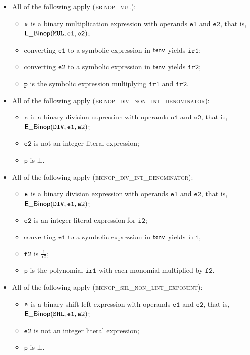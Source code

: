 \documentclass{book}
\newcommand\vitwo[0]{\texttt{i2}}
\newcommand\vftwo[0]{\texttt{f2}}
\newcommand\vp[0]{\texttt{p}}
\newcommand\veone[0]{\texttt{e1}}
\newcommand\vetwo[0]{\texttt{e2}}
\newcommand\irone[0]{\texttt{ir1}}
\newcommand\irtwo[0]{\texttt{ir2}}
\begin{document}
\begin{itemize}
  \item All of the following apply (\textsc{ebinop\_mul}):
  \begin{itemize}
    \item $\texttt{e}$ is a binary multiplication expression with operands $\veone$ and $\vetwo$, that is, \\ $\EBinop(\MUL, \veone, \vetwo)$;
    \item converting $\veone$ to a symbolic expression in $\textsf{tenv}$ yields $\irone$\ProseOrTypeErrorOrBot;
    \item converting $\vetwo$ to a symbolic expression in $\textsf{tenv}$ yields $\irtwo$\ProseOrTypeErrorOrBot;
    \item $\vp$ is the symbolic expression multiplying $\irone$ and $\irtwo$.
  \end{itemize}

  \item All of the following apply (\textsc{ebinop\_div\_non\_int\_denominator}):
  \begin{itemize}
    \item $\texttt{e}$ is a binary division expression with operands $\veone$ and $\vetwo$, that is, \\ $\EBinop(\DIV, \veone, \vetwo)$;
    \item $\vetwo$ is not an integer literal expression;
    \item $\vp$ is $\bot$.
  \end{itemize}

  \item All of the following apply (\textsc{ebinop\_div\_int\_denominator}):
  \begin{itemize}
    \item $\texttt{e}$ is a binary division expression with operands $\veone$ and $\vetwo$, that is, \\ $\EBinop(\DIV, \veone, \vetwo)$;
    \item $\vetwo$ is an integer literal expression for $\vitwo$;
    \item converting $\veone$ to a symbolic expression in $\textsf{tenv}$ yields $\irone$\ProseOrTypeErrorOrBot;
    \item $\vftwo$ is $\frac{1}{\vitwo}$;
    \item $\vp$ is the polynomial $\irone$ with each monomial multiplied by $\vftwo$.
  \end{itemize}

  \item All of the following apply (\textsc{ebinop\_shl\_non\_lint\_exponent}):
  \begin{itemize}
    \item $\texttt{e}$ is a binary shift-left expression with operands $\veone$ and $\vetwo$, that is, \\ $\EBinop(\SHL, \veone, \vetwo)$;
    \item $\vetwo$ is not an integer literal expression;
    \item $\vp$ is $\bot$.
  \end{itemize}


\end{itemize}
\end{document}
